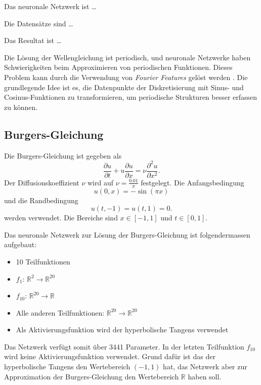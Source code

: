  Das neuronale Netzwerk ist \ldots

 Die Datensätze sind \ldots

 Das Resultat ist \ldots

Die Lösung der Wellengleichung ist periodisch, und neuronale Netzwerke haben Schwierigkeiten beim Approximieren von periodischen Funktionen.
Dieses Problem kann durch die Verwendung von \emph{Fourier Features} gelöst werden \cite{neuronal:fourier_features}.
Die grundlegende Idee ist es, die Datenpunkte der Diskretisierung mit Sinus- und Cosinus-Funktionen zu transformieren, um periodische Strukturen besser erfassen zu können.

\subsection{Burgers-Gleichung}\label{neuronal:subsection:burgers_gleichung}
Die Burgers-Gleichung ist gegeben als
\begin{equation}
    \frac{\partial u}{\partial t} + u \frac{\partial u}{\partial x} = \nu \frac{\partial^2 u}{\partial x^2}.
    \label{neuronal:burgers}
\end{equation}
Der Diffusionskoeffizient \( \nu \) wird auf \( \nu = \frac{0.01}{\pi} \) festgelegt.
Die Anfangsbedingung
\begin{equation}
    u(0, x) = - \sin(\pi x)
    \label{neuronal:burgers_anfang}
\end{equation}
und die Randbedingung
\begin{equation}
    u(t, -1) = u(t, 1) = 0.
    \label{neuronal:burgers_rand}
\end{equation}
werden verwendet.
Die Bereiche sind \( x \in [-1,1] \) und \( t \in [0,1] \).

Das neuronale Netzwerk zur Lösung der Burgers-Gleichung ist folgendermassen aufgebaut:
\begin{itemize}
    \item 10 Teilfunktionen
    \item \( f_1 \): \( \mathbb{R}^2 \longrightarrow \mathbb{R}^{20} \) 
    \item \( f_{10} \): \( \mathbb{R}^{20} \longrightarrow \mathbb{R} \)
    \item Alle anderen Teilfunktionen: \( \mathbb{R}^{20} \longrightarrow \mathbb{R}^{20} \)
    \item Als Aktivierungsfunktion wird der hyperbolische Tangens verwendet
\end{itemize}
Das Netzwerk verfügt somit über 3441 Parameter.
In der letzten Teilfunktion \( f_{10} \) wird keine Aktivierungsfunktion verwendet.
Grund dafür ist das der hyperbolische Tangens den Wertebereich \((-1, 1)\) hat, das Netzwerk aber zur Approximation der Burgers-Gleichung den Wertebereich \( \mathbb{R} \) haben soll.

